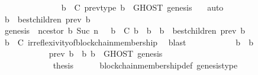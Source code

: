 \begin{isabellebody}
\ \ \ \ \ \ \ \ \ \ \isamarkupfalse%
\ {\isacartoucheopen}{\isasymsigma}\ {\isasymin}\ {\isasymSigma}{\isacartoucheclose}\ {\isacartoucheopen}b\ {\isasymin}\ C{\isacartoucheclose}\ prev{\isacharunderscore}type\ {\isacartoucheopen}b{\isacharprime}{\isacharprime}\ {\isasymin}\ GHOST\ {\isacharparenleft}{\isacharbraceleft}genesis{\isacharbraceright}{\isacharcomma}\ {\isasymsigma}{\isacharparenright}{\isacartoucheclose}\ \isamarkupfalse%
\ auto\ \isanewline
\ \ \ \ \ \ \ \ \isamarkupfalse%
\ {\isachardoublequoteopen}b\ {\isasymin}\ best{\isacharunderscore}children\ {\isacharparenleft}prev\ b{\isacharcomma}\ {\isasymsigma}{\isacharparenright}{\isachardoublequoteclose}\isanewline
\ \ \ \ \ \ \ \ \ \ \isamarkupfalse%
\ {\isacartoucheopen}genesis\ {\isacharequal}\ n{\isacharunderscore}cestor\ {\isacharparenleft}b{\isacharcomma}\ Suc\ n{\isacharparenright}\ {\isasymand}\ {\isacharparenleft}{\isasymforall}\ b{\isacharprime}\ {\isasymin}\ C{\isachardot}\ b{\isacharprime}\ {\isasymdownharpoonright}\ b\ {\isasymlongrightarrow}\ b{\isacharprime}\ {\isasymin}\ best{\isacharunderscore}children\ {\isacharparenleft}prev\ b{\isacharprime}{\isacharcomma}\ {\isasymsigma}{\isacharparenright}{\isacharparenright}{\isacartoucheclose}\isanewline
\ \ \ \ \ \ \ \ \ \ \isamarkupfalse%
\ {\isacartoucheopen}b\ {\isasymin}\ C{\isacartoucheclose}\ irreflexivity{\isacharunderscore}of{\isacharunderscore}blockchain{\isacharunderscore}membership\ \isamarkupfalse%
\ blast\isanewline
\ \ \ \ \ \ \ \ \isamarkupfalse%
\ \isamarkupfalse%
\ {\isachardoublequoteopen}b\ {\isasymdownharpoonright}\ b{\isacharprime}{\isacharprime}{\isachardoublequoteclose}\ \ \ \isanewline
\ \ \ \ \ \ \ \ \ \ \isamarkupfalse%
\ {\isacartoucheopen}prev\ b\ {\isasymdownharpoonright}\ b{\isacharprime}{\isacharprime}{\isacartoucheclose}\ {\isacartoucheopen}b{\isacharprime}{\isacharprime}\ {\isasymin}\ GHOST\ {\isacharparenleft}{\isacharbraceleft}genesis{\isacharbraceright}{\isacharcomma}\ {\isasymsigma}{\isacharparenright}{\isacartoucheclose}\ \ \ \ \ \ \ \ \ \ \isanewline
\ \ \ \ \ \ \ \ \ \ \isamarkupfalse%
\isanewline
\ \ \ \ \ \ \isamarkupfalse%
\isanewline
\ \ \ \ \isamarkupfalse%
\isanewline
\ \ \isamarkupfalse%
\isanewline
\ \ \isamarkupfalse%
\ \isamarkupfalse%
\ {\isacharquery}thesis\isanewline
\ \ \ \ \isamarkupfalse%
\ blockchain{\isacharunderscore}membership{\isacharunderscore}def\ genesis{\isacharunderscore}type{\isacharparenleft}{}{\isacharparenright}\ \isamarkupfalse%

\end{isabellebody}
